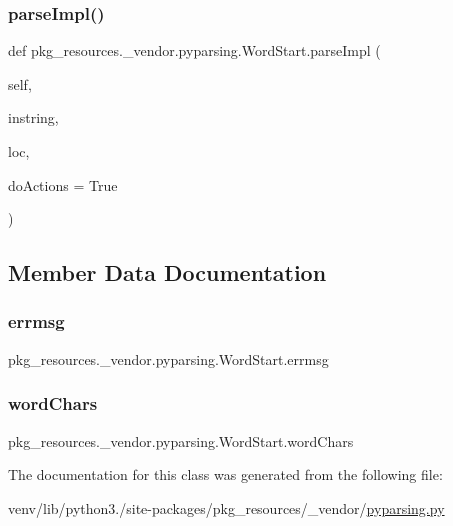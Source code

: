 \subsubsection{\texorpdfstring{parse\+Impl()}{parseImpl()}}
{\footnotesize\ttfamily def pkg\+\_\+resources.\+\_\+vendor.\+pyparsing.\+Word\+Start.\+parse\+Impl (\begin{DoxyParamCaption}\item[{}]{self,  }\item[{}]{instring,  }\item[{}]{loc,  }\item[{}]{do\+Actions = {\ttfamily True} }\end{DoxyParamCaption})}



\subsection{Member Data Documentation}
\mbox{\label{classpkg__resources_1_1__vendor_1_1pyparsing_1_1WordStart_a66ee823834a600df42eedf637704b0e5}} 
\subsubsection{\texorpdfstring{errmsg}{errmsg}}
{\footnotesize\ttfamily pkg\+\_\+resources.\+\_\+vendor.\+pyparsing.\+Word\+Start.\+errmsg}

\mbox{\label{classpkg__resources_1_1__vendor_1_1pyparsing_1_1WordStart_ab890bc5bfb9970e5a2ff4394b4a52bf0}} 
\subsubsection{\texorpdfstring{word\+Chars}{wordChars}}
{\footnotesize\ttfamily pkg\+\_\+resources.\+\_\+vendor.\+pyparsing.\+Word\+Start.\+word\+Chars}



The documentation for this class was generated from the following file\+:\begin{DoxyCompactItemize}
\item 
venv/lib/python3./site-\/packages/pkg\+\_\+resources/\+\_\+vendor/\hyperlink{pkg__resources_2__vendor_2pyparsing_8py}{pyparsing.\+py}\end{DoxyCompactItemize}
